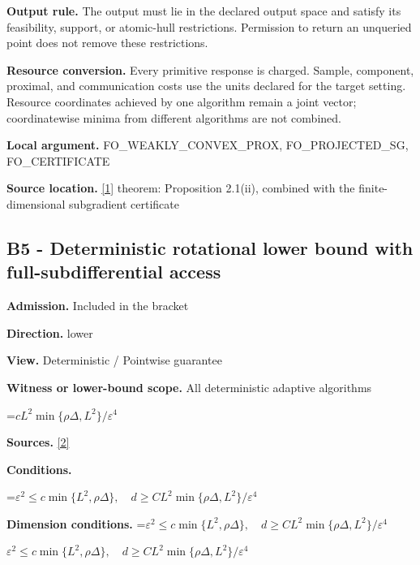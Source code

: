 \documentclass[10pt,a4paper]{article}
\newcommand{\AtlasMath}[1]{\par\begingroup\centering\setbox0=\hbox{$\displaystyle #1$}\ifdim\wd0>1.4\linewidth\typeout{ATLAS WIDE FORMULA: \the\wd0}\fi\ifdim\wd0>\linewidth\resizebox{\linewidth}{!}{\box0}\else\box0\fi\par\endgroup}
\newcommand{\AtlasInlineMath}[1]{\begingroup\setbox0=\hbox{$#1$}\ifdim\wd0>.4\linewidth\endgroup\AtlasMath{#1}\else\endgroup$#1$\fi}
\begin{document}
\textbf{Output rule.} The output must lie in the declared output space and satisfy its feasibility, support, or atomic-hull restrictions. Permission to return an unqueried point does not remove these restrictions.



\textbf{Resource conversion.} Every primitive response is charged. Sample, component, proximal, and communication costs use the units declared for the target setting. Resource coordinates achieved by one algorithm remain a joint vector; coordinatewise minima from different algorithms are not combined.



\textbf{Local argument.} FO\_WEAKLY\_CONVEX\_PROX, FO\_PROJECTED\_SG, FO\_CERTIFICATE



\textbf{Source location.} \href{https://www2.isye.gatech.edu/~nemirovs/MOR_AccuracyCertificates.pdf}{[1]} theorem: Proposition 2.1(ii), combined with the finite-dimensional subgradient certificate



\subsection{B5 - Deterministic rotational lower bound with full-subdifferential access}


\textbf{Admission.} Included in the bracket



\textbf{Direction.} lower



\textbf{View.} Deterministic / Pointwise guarantee



\textbf{Witness or lower-bound scope.} All deterministic adaptive algorithms



\AtlasMath{cL^2\min\{\rho\Delta,L^2\}/\varepsilon^4}


\textbf{Sources.} \href{https://arxiv.org/pdf/2608.03246}{[2]}



\textbf{Conditions.}
\AtlasMath{\varepsilon^2\le c\min\{L^2,\rho\Delta\},\quad d\ge C L^2\min\{\rho\Delta,L^2\}/\varepsilon^4}




\textbf{Dimension conditions.} \AtlasInlineMath{\varepsilon^2\le c\min\{L^2,\rho\Delta\},\quad d\ge C L^2\min\{\rho\Delta,L^2\}/\varepsilon^4}
\end{document}
